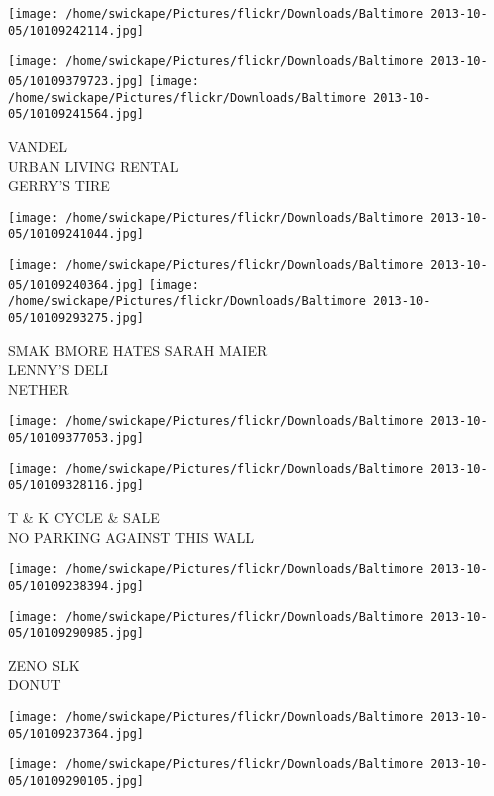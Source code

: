 \documentclass[10pt,letterpaper]{article}
\begin{document}
\texttt{[image: /home/swickape/Pictures/flickr/Downloads/Baltimore 2013-10-05/10109242114.jpg]}

\vspace{0.25in}
\texttt{[image: /home/swickape/Pictures/flickr/Downloads/Baltimore 2013-10-05/10109379723.jpg]}
\texttt{[image: /home/swickape/Pictures/flickr/Downloads/Baltimore 2013-10-05/10109241564.jpg]}

VANDEL\\
URBAN LIVING RENTAL\\
GERRY'S TIRE
\pagebreak

\texttt{[image: /home/swickape/Pictures/flickr/Downloads/Baltimore 2013-10-05/10109241044.jpg]}

\vspace{0.25in}
\texttt{[image: /home/swickape/Pictures/flickr/Downloads/Baltimore 2013-10-05/10109240364.jpg]}
\texttt{[image: /home/swickape/Pictures/flickr/Downloads/Baltimore 2013-10-05/10109293275.jpg]}

SMAK BMORE HATES SARAH MAIER\\
LENNY'S DELI\\
NETHER
\pagebreak

\texttt{[image: /home/swickape/Pictures/flickr/Downloads/Baltimore 2013-10-05/10109377053.jpg]}

\vspace{0.25in}
\texttt{[image: /home/swickape/Pictures/flickr/Downloads/Baltimore 2013-10-05/10109328116.jpg]}

T \& K CYCLE \& SALE\\
NO PARKING AGAINST THIS WALL
\pagebreak

\texttt{[image: /home/swickape/Pictures/flickr/Downloads/Baltimore 2013-10-05/10109238394.jpg]}

\vspace{0.25in}
\texttt{[image: /home/swickape/Pictures/flickr/Downloads/Baltimore 2013-10-05/10109290985.jpg]}

ZENO SLK\\
DONUT
\pagebreak

\texttt{[image: /home/swickape/Pictures/flickr/Downloads/Baltimore 2013-10-05/10109237364.jpg]}

\vspace{0.25in}
\texttt{[image: /home/swickape/Pictures/flickr/Downloads/Baltimore 2013-10-05/10109290105.jpg]}
\end{document}
